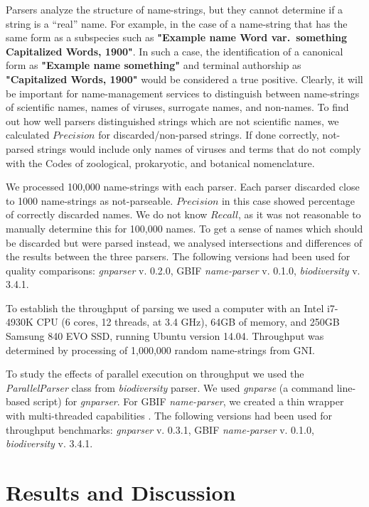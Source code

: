 \documentclass{bmcart}
\begin{document}
Parsers analyze the structure of name-strings, but they cannot determine if a
string is a ``real'' name. For example, in the case of a name-string that has
the same form as a subspecies such as \textbf{"Example name Word var.\
something Capitalized Words, 1900"}. In such a case, the identification of a
canonical form as \textbf{"Example name something"} and terminal authorship as
\textbf{"Capitalized Words, 1900"} would be considered a true positive.
Clearly, it will be important for name-management services to distinguish
between name-strings of scientific names, names of viruses, surrogate names,
and non-names. To find out how well parsers distinguished strings which are not
scientific names, we calculated $Precision$ for discarded/non-parsed strings.
If done correctly, not-parsed strings would include only names of viruses and
terms that do not comply with the Codes of zoological, prokaryotic, and
botanical nomenclature.

We processed 100,000 name-strings with each parser. Each parser discarded
close to 1000 name-strings as not-parseable. $Precision$ in this case showed
percentage of correctly discarded names. We do not know $Recall$, as it was
not reasonable to manually determine this for 100,000 names. To get a sense of
names which should be discarded but were parsed instead, we analysed
intersections and differences of the results between the three parsers. The
following versions had been used for quality comparisons: \textit{gnparser} v.
0.2.0, GBIF \textit{name-parser} v. 0.1.0, \textit{biodiversity} v. 3.4.1.

To establish the throughput of parsing we used a computer with an Intel
i7-4930K CPU (6 cores, 12 threads, at 3.4 GHz), 64GB of memory, and 250GB
Samsung 840 EVO SSD, running Ubuntu version 14.04. Throughput was determined by
processing of 1,000,000 random name-strings from GNI.

To study the effects of parallel execution on throughput we used the
\textit{ParallelParser} class from \textit{biodiversity} parser. We used
\textit{gnparse} (a command line-based script) for \textit{gnparser}. For GBIF
\textit{name-parser}, we created a thin wrapper with multi-threaded
capabilities \cite{gbifparser}. The following versions had been used for
throughput benchmarks: \textit{gnparser} v. 0.3.1, GBIF \textit{name-parser} v.
0.1.0, \textit{biodiversity} v. 3.4.1.

\section*{Results and Discussion}\label{sec:discussion}
\end{document}

